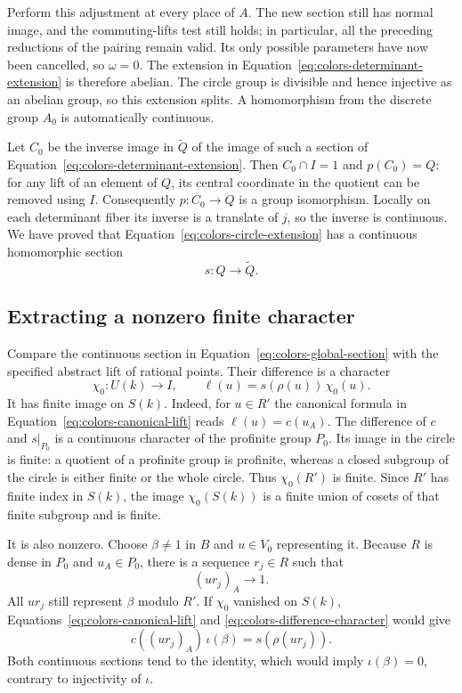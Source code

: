 Perform this adjustment at every place of $A$.  The new section still
has normal image, and the commuting-lifts test still holds; in
particular, all the preceding reductions of the pairing remain valid.
Its only possible parameters have now been cancelled, so $\omega=0$.
The extension in Equation~\eqref{eq:colors-determinant-extension} is
therefore abelian.  The circle group is divisible and hence injective
as an abelian group, so this extension splits.  A homomorphism from the
discrete group $A_0$ is automatically continuous.

Let $C_0$ be the inverse image in $\widetilde Q$ of the image of such
a section of Equation~\eqref{eq:colors-determinant-extension}.  Then
$C_0\cap I=1$ and $p(C_0)=Q$: for any lift of an element of $Q$, its
central coordinate in the quotient can be removed using $I$.
Consequently $p:C_0\to Q$ is a group isomorphism.  Locally on each
determinant fiber its inverse is a translate of $j$, so the inverse is
continuous.  We have proved that Equation~\eqref{eq:colors-circle-extension}
has a continuous homomorphic section
\begin{equation}\label{eq:colors-global-section}
 s:Q\longrightarrow\widetilde Q.
\end{equation}

\subsection{Extracting a nonzero finite character}

Compare the continuous section in Equation~\eqref{eq:colors-global-section}
with the specified abstract lift of rational points.  Their difference
is a character
\begin{equation}\label{eq:colors-difference-character}
 \chi_0:U(k)\longrightarrow I,
 \qquad \ell(u)=s(\rho(u))\,\chi_0(u).
\end{equation}
It has finite image on $S(k)$.  Indeed, for $u\in R'$ the canonical
formula in Equation~\eqref{eq:colors-canonical-lift} reads
$\ell(u)=c(u_A)$.  The difference of $c$ and $s|_{P_0}$ is a continuous
character of the profinite group $P_0$.  Its image in the circle is
finite: a quotient of a profinite group is profinite, whereas a closed
subgroup of the circle is either finite or the whole circle.  Thus
$\chi_0(R')$ is finite.  Since $R'$ has finite index in $S(k)$, the image
$\chi_0(S(k))$ is a finite union of cosets of that finite subgroup and
is finite.

It is also nonzero.  Choose $\beta\ne1$ in $B$ and $u\in V_0$
representing it.  Because $R$ is dense in $P_0$ and $u_A\in P_0$,
there is a sequence $r_j\in R$ such that
\[
 (ur_j)_A\longrightarrow1.
\]
All $ur_j$ still represent $\beta$ modulo $R'$.  If $\chi_0$ vanished
on $S(k)$, Equations~\eqref{eq:colors-canonical-lift} and
\eqref{eq:colors-difference-character} would give
\[
 c((ur_j)_A)\,\iota(\beta)=s(\rho(ur_j)).
\]
Both continuous sections tend to the identity, which would imply
$\iota(\beta)=0$, contrary to injectivity of $\iota$.

